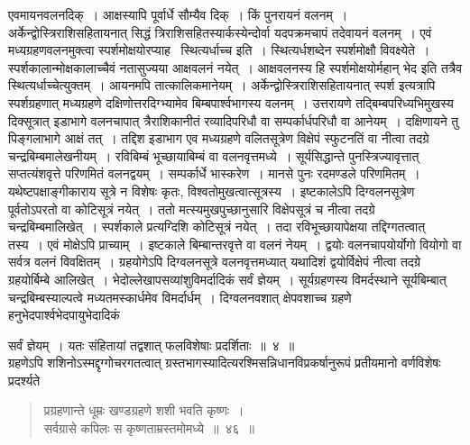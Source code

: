 \documentclass[11pt, openany]{book}
\begin{document}
\noindent एवमायनवलनदिक्~। आक्षस्यापि पूर्वार्धे सौम्यैव दिक्~। किं पुनरायनं वलनम्~। अर्केन्द्वोस्त्रिराशिसहितायनात् सिद्धं त्रिराशिसहितस्यार्कस्येन्दोर्वा यदपक्रमचापं तदेवायनं वलनम्~। एवं मध्यग्रहणवलनमुक्त्वा स्पर्शमोक्षयोरप्याह \textendash\ {\qt स्थित्यर्धाच्च} इति~। स्थित्यर्धशब्देन स्पर्शमोक्षौ विवक्ष्येते~। स्पर्शकालान्मोक्षकालाच्चैवं नतासुज्यया आक्षवलनं नयेत्~। आक्षवलनस्य हि स्पर्शमोक्षयोर्महान् भेद इति तत्रैव स्थित्यर्धाच्चेत्युक्तम्~। आयनमपि तात्कालिकमानेयम्~। {\qt अर्केन्द्वोस्त्रिराशिसहितायनात् स्पर्श} इत्यत्रापि स्पर्शग्रहणात् मध्यग्रहणे दक्षिणोत्तरदिग्भ्यामेव बिम्बपार्श्वभागस्य वलनम्~। उत्तरायणे तद्बिम्बपरिध्यभिमुखस्य दिक्सूत्रात् इडाभागे वलनचापात् त्रैराशिकानीतं रव्यादिपरिधौ वा सम्पर्कार्धपरिधौ वा आनेयम्~। दक्षिणायने तु पिङ्गलाभागे आक्षं तत्~। तद्दिश इडाभाग एव मध्यग्रहणे वलितसूत्रेण विक्षेपं स्फुटनतिं वा नीत्वा तदग्रे चन्द्रबिम्बमालेखनीयम्~। रविबिम्बं भूच्छायाबिम्बं वा वलनवृत्तमध्ये~। सूर्यसिद्धान्ते पुनस्त्रिज्यावृत्तात् सप्तत्यंशवृत्ते परिणमितं वलनद्वयम्~। सम्पर्कार्धे भास्करेण~। मानसे पुनः रदमण्डले परिणमितम्~। यथेष्टपक्षाङ्गीकाराय सूत्रे न विशेषः कृतः, विश्वतोमुखत्वात्सूत्रस्य~। इष्टकालेऽपि दिग्वलनसूत्रेण पूर्वतोऽपरतो वा कोटिसूत्रं नयेत्~। ततो मत्स्यमुखपुच्छानुसारि विक्षेपसूत्रं च नीत्वा तदग्रे चन्द्रबिम्बमालिखेत्~। स्पर्शकाले प्रत्यग्दिशि कोटिसूत्रं नयेत्~। तदा रविभूच्छायापेक्षया तद्दिग्गतत्वात् तस्य~। एवं मोक्षेऽपि प्राच्याम्~। इष्टकाले बिम्बान्तरवृत्ते वा वलनं नेयम्~। द्वयोः वलनचापयोर्योगो वियोगो वा सर्वत्र वलनं विवक्षितम्~। ग्रहयोगेऽपि दिग्वलनसूत्रे वलनवृत्तमध्यात् यथादिशं द्वयोर्विक्षेपं नीत्वा तदग्रे ग्रहयोर्बिम्बे आलिखेत्~। भेदोल्लेखापसव्यांशुविमर्दादिकं सर्वं ज्ञेयम्~। सूर्यग्रहणस्य विमर्दस्थाने सूर्यबिम्बात् चन्द्रबिम्बस्याल्पत्वे मध्यतमस्कार्धमेव विमर्दार्धम्~। दिग्वलनवशात् क्षेपवशाच्च ग्रहणे हनुभेदपार्श्वभेदपायुभेदादिकं

\newpage

\noindent सर्वं ज्ञेयम्~। यतः संहितायां तद्वशात् फलविशेषाः प्रदर्शिताः~॥~४~॥\\

\indent ग्रहणेऽपि शशिनोऽस्मद्दृग्गोचरगतत्वात् ग्रस्तभागस्यादित्यरश्मिसन्निधानविप्रकर्षानुरूपं प्रतीयमानो वर्णविशेषः प्रदर्श्यते\textendash 
\begin{quote}
{\ab प्रग्रहणान्ते धूम्रः खण्डग्रहणे शशी भवति कृष्णः~।\\
	सर्वग्रासे कपिलः स कृष्णताम्रस्तमोमध्ये~॥~४६~॥} 
\end{quote}
 
\end{document}
